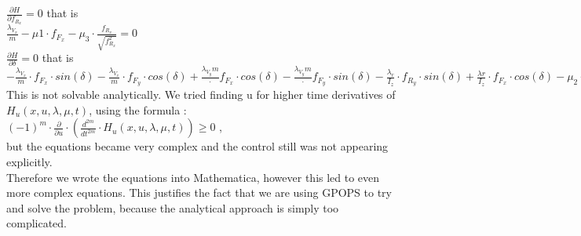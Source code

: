 \documentclass{article}
\begin{document}
$\frac{\partial H}{\partial f_{R_{x}}} = 0$ that is\\ 

$\frac{\lambda_{V_{x}}}{m} - \mu{1} \cdot f_{F_{x}} -\mu_{3} \cdot \frac{f_{R_{x}}}{\sqrt{f_{R_{x}}^2}} = 0$\\

$\frac{\partial H}{\partial \delta}  = 0$ that is \\

$ - \frac{\lambda_{V_{x}}}{m} \cdot f_{F_{x}} \cdot sin(\delta) - \frac{\lambda_{V_{x}}}{m} \cdot f_{F_{y}} \cdot cos(\delta) + \frac{\lambda_{V_{y}}{m}}\cdot f_{F_{x}} \cdot cos(\delta) - \frac{\lambda_{V_{y}}{m}} \cdot f_{F_{y}} \cdot sin(\delta) - \frac{\lambda_{r}}{I_{z}} \cdot f_{R_{y}} \cdot sin(\delta) + \frac{\lambda{r}}{I_{z}} \cdot f_{F_{x}} \cdot cos(\delta) - \mu_{2} \cdot \frac{\delta}{\sqrt{\delta^2}}= 0$ \\

This is not solvable analytically. We tried finding u for higher time derivatives of $H_{u}(x,u,\lambda,\mu,t)$, using the formula :\\

$(-1)^m \cdot \frac{\partial}{\partial u}\cdot (\frac{d^{2m}}{dt^{2m}} \cdot H_{u}(x,u,\lambda,\mu,t)) \geq 0$ , \\

but the equations became very complex and the control still was not appearing explicitly. \\
Therefore we wrote the equations into Mathematica, however this led to even more complex equations. This justifies the fact that we are using GPOPS to try and solve the problem, because the analytical approach is simply too complicated.\\
\end{document}
